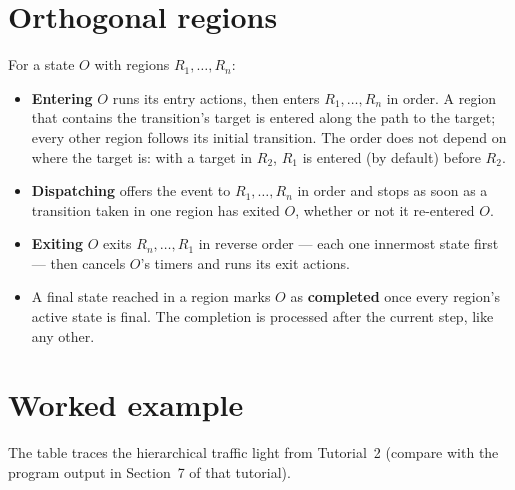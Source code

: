 \documentclass[11pt,a4paper,openany]{report}
\begin{document}
\section{Orthogonal regions}
For a state $O$ with regions $R_1,\dots,R_n$:
\begin{itemize}[itemsep=1pt]
  \item \textbf{Entering} $O$ runs its entry actions, then enters $R_1,\dots,R_n$ in order. A region
        that contains the transition's target is entered along the path to the target; every other
        region follows its initial transition. The order does not depend on where the target is: with
        a target in $R_2$, $R_1$ is entered (by default) before $R_2$.
  \item \textbf{Dispatching} offers the event to $R_1,\dots,R_n$ in order and stops as soon as a
        transition taken in one region has exited $O$, whether or not it re-entered $O$.
  \item \textbf{Exiting} $O$ exits $R_n,\dots,R_1$ in reverse order --- each one innermost state
        first --- then cancels $O$'s timers and runs its exit actions.
  \item A final state reached in a region marks $O$ as \textbf{completed} once every region's active
        state is final. The completion is processed after the current step, like any other.
\end{itemize}

\section{Worked example}
The table traces the hierarchical traffic light from Tutorial~2 (compare with the program output in
Section~7 of that tutorial).
\end{document}
